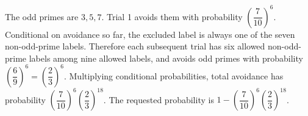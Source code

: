 The odd primes are $3,5,7$. Trial 1 avoids them with probability $(\dfrac{7}{10})^6$. Conditional on avoidance so far, the excluded label is always one of the seven non-odd-prime labels. Therefore each subsequent trial has six allowed non-odd-prime labels among nine allowed labels, and avoids odd primes with probability $(\dfrac{6}{9})^6=(\dfrac{2}{3})^6$. Multiplying conditional probabilities, total avoidance has probability $(\dfrac{7}{10})^6(\dfrac{2}{3})^{18}$. The requested probability is $\boxed{1-(\dfrac{7}{10})^6(\dfrac{2}{3})^{18}}$.
